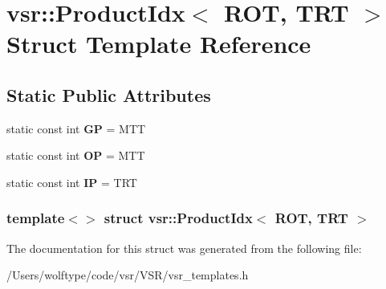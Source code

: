 \hypertarget{structvsr_1_1_product_idx_3_01_r_o_t_00_01_t_r_t_01_4}{\section{vsr\-:\-:Product\-Idx$<$ R\-O\-T, T\-R\-T $>$ Struct Template Reference}
\label{structvsr_1_1_product_idx_3_01_r_o_t_00_01_t_r_t_01_4}
}
\subsection*{Static Public Attributes}
\begin{DoxyCompactItemize}
\item 
\hypertarget{structvsr_1_1_product_idx_3_01_r_o_t_00_01_t_r_t_01_4_ac9453d306efa490859dfdc7998dd7eaa}{static const int {\bfseries G\-P} = M\-T\-T}\label{structvsr_1_1_product_idx_3_01_r_o_t_00_01_t_r_t_01_4_ac9453d306efa490859dfdc7998dd7eaa}

\item 
\hypertarget{structvsr_1_1_product_idx_3_01_r_o_t_00_01_t_r_t_01_4_a9d34216a6231117c899fcd443d32e74a}{static const int {\bfseries O\-P} = M\-T\-T}\label{structvsr_1_1_product_idx_3_01_r_o_t_00_01_t_r_t_01_4_a9d34216a6231117c899fcd443d32e74a}

\item 
\hypertarget{structvsr_1_1_product_idx_3_01_r_o_t_00_01_t_r_t_01_4_aafd3b833ac750a57a7012c69d58fedb3}{static const int {\bfseries I\-P} = T\-R\-T}\label{structvsr_1_1_product_idx_3_01_r_o_t_00_01_t_r_t_01_4_aafd3b833ac750a57a7012c69d58fedb3}

\end{DoxyCompactItemize}
\subsubsection*{template$<$$>$ struct vsr\-::\-Product\-Idx$<$ R\-O\-T, T\-R\-T $>$}



The documentation for this struct was generated from the following file\-:\begin{DoxyCompactItemize}
\item 
/\-Users/wolftype/code/vsr/\-V\-S\-R/vsr\-\_\-templates.\-h\end{DoxyCompactItemize}
